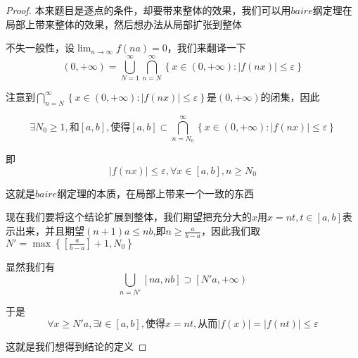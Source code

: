 \documentclass[lang=cn,10pt]{elegantbook}
\begin{document}
	\begin{proof}
		本来题目是逐点的条件，却要带来整体的效果，我们可以用$baire$纲定理在局部上带来整体的效果，然后想办法从局部扩张到整体
		
		不失一般性，设$\lim_{n\rightarrow \infty} f\left( na \right)=0 $，我们来翻译一下
		\begin{equation*}
			\left( 0,+\infty \right) =\bigcup_{N=1}^{\infty}{\bigcap_{n=N}^{\infty}{\left\{ x\in \left( 0,+\infty \right) :|f\left( nx \right) |\le \varepsilon \right\}}}
		\end{equation*}
		
		注意到$
		\bigcap_{n=N}^{\infty}{\left\{ x\in \left( 0,+\infty \right) :|f\left( nx \right) |\le \varepsilon \right\}}
		$是$\left( 0,+\infty \right)$的闭集，因此
		
		\begin{equation*}
			\exists N_0\ge 1,\text{和}\left[ a,b \right] ,\text{使得}\left[ a,b \right] \subset \bigcap_{n=N_0}^{\infty}{\left\{ x\in \left( 0,+\infty \right) :|f\left( nx \right) |\le \varepsilon \right\}}
		\end{equation*}
		
		即
		\begin{equation*}
			|f\left( nx \right) |\le \varepsilon ,\forall x\in \left[ a,b \right] ,n\ge N_0
		\end{equation*}
		
		这就是$baire$纲定理的本质，在局部上带来一个一致的东西
		
		现在我们要将这个结论扩展到整体，我们期望把充分大的$x$用$x=nt,t\in[a,b]$表示出来，并且期望$(n+1)a\le nb $,即$n\ge \frac{a}{b-a}$，因此我们取$N'=\max \left\{ \left[ \frac{a}{b-a} \right] +1,N_0 \right\} $
		
		显然我们有
		\begin{equation*}
			\bigcup_{n=N'}{\left[ na,nb \right]}\supset \left[ N'a,+\infty \right) 
		\end{equation*}
		
		于是
		\begin{equation*}
			\forall x\ge N'a,\exists t\in \left[ a,b \right] ,\text{使得}x=nt,\text{从而}|f\left( x \right) |=|f\left( nt \right) |\le \varepsilon 
		\end{equation*}
		
		这就是我们想得到结论的定义
	\end{proof}
	
\end{document}

